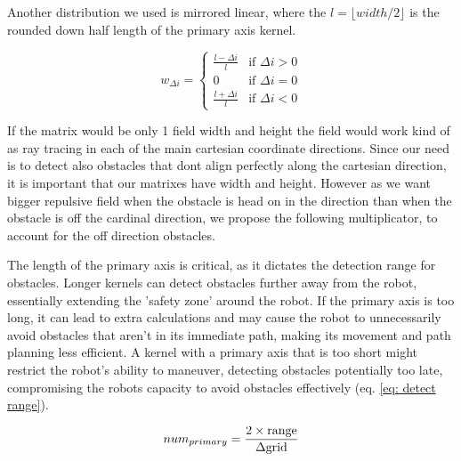 \documentclass[letterpaper, 10 pt, conference]{ieeeconf}  %
\begin{document}
Another distribution we used is mirrored linear, where the $l=\lfloor width / 2 \rfloor$ is the rounded down half length of the primary axis kernel. 

\begin{equation}
	w_{\Delta i} = 
	\begin{cases} 
	 	\frac{l - \Delta i}{l} & \text{if } \Delta i > 0 \\
		0 & \text{if } \Delta i = 0 \\
		\frac{l + \Delta i}{l}& \text{if } \Delta i < 0 
	\end{cases}
\end{equation}


If the matrix would be only 1 field width and height the field would work kind of as ray tracing in each of the main cartesian coordinate directions. Since our need is to detect also obstacles that dont align perfectly along the cartesian direction, it is important that our matrixes have width and height. However as we want bigger repulsive field when the obstacle is head on in the direction than when the obstacle is off the cardinal direction, we propose the following multiplicator, to account for the off direction obstacles.




The length of the primary axis is critical, as it dictates the detection range for obstacles. Longer kernels can detect obstacles further away
from the robot, essentially extending the ’safety zone’ around the robot. If the primary axis is too long, it can lead to extra calculations and may cause the robot to unnecessarily avoid obstacles that aren't in its immediate path, making its movement and path planning less efficient. A kernel with a primary axis that is too short might restrict the robot's ability to maneuver, detecting obstacles potentially too late, compromising the robots capacity to avoid obstacles effectively (eq. \ref{eq: detect range}). 

\begin{equation}
	\label{eq: detect range}
	num_{primary} = \frac{2 \times \mathrm{range}}{\Delta \mathrm{grid}}\\
\end{equation}


\end{document}
